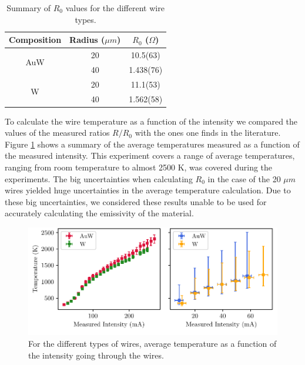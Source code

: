 \begin{table}[h]
    \centering
    \begin{tabular}{ccc}
    \hline
    Composition          & Radius ($\mu m$) & $R_0$ ($\Omega$) \\ \hline
    \multirow{2}{*}{AuW} & 20               & 10.5(63)         \\
                         & 40               & 1.438(76)        \\
    \multirow{2}{*}{W}   & 20               & 11.1(53)         \\
                         & 40               & 1.562(58)        \\ \hline
    \end{tabular}
    \caption{Summary of $R_0$ values for the different wire types. }
    \label{tab:R0table}
\end{table}

To calculate the wire temperature as a function of the intensity we compared the values of the measured ratios $R/R_{0}$ with the ones one finds in the literature. Figure \ref{fig:MeasTempCurrent} shows a summary of the average temperatures measured as a function of the measured intensity. This experiment covers a range of average temperatures, ranging from room temperature to almost 2500 K, was covered during the experiments. The big uncertainties when calculating $R_0$ in the case of the 20 $\mu m$ wires yielded huge uncertainties in the average temperature calculation. Due to these big uncertainties, we considered these results unable to be used for accurately calculating the emissivity of the material.  

\begin{figure}[h]
    \centering
    \includegraphics[width=1.0\columnwidth]{Figure_CalculatedIntTemp/IntensityTemp.pdf}
    \caption{For the different types of wires, average temperature as a function of the intensity going through the wires.}
    \label{fig:MeasTempCurrent}
\end{figure}

